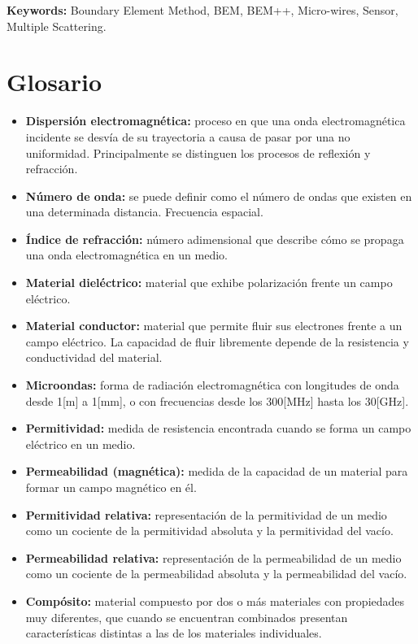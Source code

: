 \documentclass[12pt,letterpaper]{article}
\numberwithin{equation}{section}
\begin{document}
\noindent\textbf{Keywords:} Boundary Element Method, BEM, BEM++, Micro-wires, Sensor,\\ Multiple Scattering.
\pagebreak
\section*{Glosario}
\begin{itemize}
	\renewcommand\labelitemi{--}
	\item \textbf{Dispersión electromagnética:} proceso en que una onda electromagnética incidente se desvía de su trayectoria a causa de pasar por una no uniformidad. Principalmente se distinguen los procesos de reflexión y refracción. 
	\item \textbf{Número de onda:} se puede definir como el número de ondas que existen en una determinada distancia. Frecuencia espacial.
	\item \textbf{Índice de refracción:} número adimensional que describe cómo se propaga una onda electromagnética en un medio.
	\item \textbf{Material dieléctrico:} material que exhibe polarización frente un campo eléctrico. 
	\item \textbf{Material conductor:} material que permite fluir sus electrones frente a un campo eléctrico. La capacidad de fluir libremente depende de la resistencia y conductividad del material.
	\item \textbf{Microondas:} forma de radiación electromagnética con longitudes de onda desde 1[m] a 1[mm], o con frecuencias desde los 300[MHz] hasta los 30[GHz].
	\item \textbf{Permitividad:} medida de resistencia encontrada cuando se forma un campo eléctrico en un medio.
	\item \textbf{Permeabilidad (magnética):} medida de la capacidad de un material para formar un campo magnético en él.
	\item \textbf{Permitividad relativa:} representación de la permitividad de un medio como un cociente de la permitividad absoluta y la permitividad del vacío. 
	\item \textbf{Permeabilidad relativa:} representación de la permeabilidad de un medio como un cociente de la permeabilidad absoluta y la permeabilidad del vacío. 
	\item \textbf{Compósito:} material compuesto por dos o más materiales con propiedades muy diferentes, que cuando se encuentran combinados presentan características distintas a las de los materiales individuales.  

\end{itemize}
\end{document}
